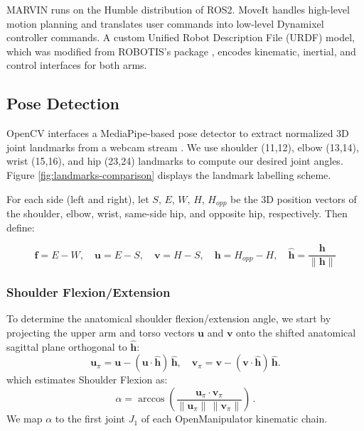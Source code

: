 \documentclass[acmsmall, screen]{acmart}
\begin{document}
MARVIN runs on the Humble distribution of ROS2. MoveIt handles high-level motion planning and translates user commands into low-level Dynamixel controller commands. A custom Unified Robot Description File (URDF) model, which was modified from ROBOTIS's package \cite{OpenManipulator2025}, encodes kinematic, inertial, and control interfaces for both arms.

\subsection{Pose Detection}
OpenCV interfaces a MediaPipe-based pose detector to extract normalized 3D joint landmarks from a webcam stream \cite{noauthor_mediapipe_nodate}. We use shoulder (11,12), elbow (13,14), wrist (15,16), and hip (23,24) landmarks to compute our desired joint angles. Figure \ref{fig:landmarks-comparison} displays the landmark labelling scheme.

For each side (left and right), let $S$, $E$, $W$, $H$, $H_{opp}$ be the 3D position vectors of the shoulder, elbow, wrist, same-side hip, and opposite hip, respectively. Then define:

\begin{equation}
  \mathbf{f}=E-W,\quad \mathbf{u}=E-S,\quad \mathbf{v}=H-S,\quad \mathbf{h}=H_{opp}-H,\quad \hat{\mathbf{h}}=\frac{\mathbf{h}}{\lVert\mathbf{h}\rVert}
\end{equation}

\subsubsection{Shoulder Flexion/Extension}
To determine the anatomical shoulder flexion/extension angle, we start by projecting the upper arm and torso vectors $\mathbf{u}$ and $\mathbf{v}$ onto the shifted anatomical sagittal plane orthogonal to $\hat{\mathbf{h}}$:
\begin{equation}
\mathbf{u}_\pi=\mathbf{u}-(\mathbf{u}\cdot\hat{\mathbf{h}})\,\hat{\mathbf{h}},\quad
\mathbf{v}_\pi=\mathbf{v}-(\mathbf{v}\cdot\hat{\mathbf{h}})\,\hat{\mathbf{h}}.
\end{equation}
which estimates Shoulder Flexion as:
\begin{equation}
\alpha=\arccos \!\left( \frac{\mathbf{u}_\pi \cdot \mathbf{v}_\pi}{\lVert\mathbf{u}_\pi\rVert\, \lVert\mathbf{v}_\pi\rVert} \right)\,.
\end{equation}
We map $\alpha$ to the first joint $J_1$ of each OpenManipulator kinematic chain.
\end{document}
